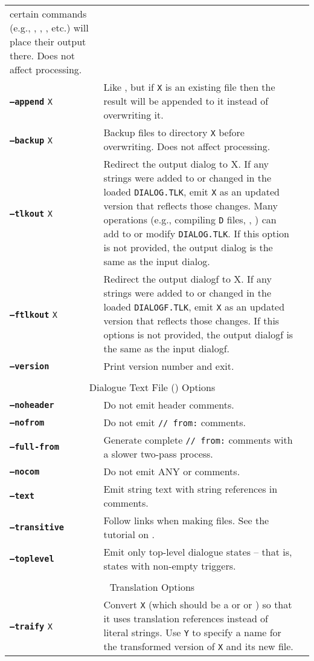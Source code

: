 \documentclass{article}
\def\ttref#1{\ahrefloc{#1}{\tt #1}}
\def\DEFINE#1{{\tt \bf #1}\label{#1}\index{#1}}
\def\t#1{{\tt #1}}
\begin{document}
\begin{tabular}{lp{10in}|p{10in}}
certain commands (e.g., \ttref{D}, \ttref{DLG}, \ttref{--biff-get}, etc.)
will place their output there.  Does not affect \ttref{TP2} processing. \\
\DEFINE{--append} \t{X} & Like \ttref{--out}, but if \t{X} is an existing
file then the result will be appended to it instead of overwriting it. \\
\DEFINE{--backup} \t{X} &	Backup files to directory {\tt X} before overwriting. Does not affect \ttref{TP2} processing. \\
\DEFINE{--tlkout} \t{X} & Redirect the output dialog to X. If any strings were added to or changed in the loaded \t{DIALOG.TLK}, emit \t{X} as an updated version that reflects those changes. Many operations (e.g., compiling \t{D} files, \ttref{--tlkmerge}, \ttref{STRING!SET}) can add to or modify \t{DIALOG.TLK}. If this option is not provided, the output dialog is the same as the input dialog. \\
\DEFINE{--ftlkout} \t{X} & Redirect the output dialogf to X. If any strings were added to or changed in the
loaded \t{DIALOGF.TLK}, emit \t{X} as an updated version that reflects
those changes. If this options is not provided, the output dialogf is the same as the input dialogf. \\
\DEFINE{--version} & Print version number and exit. \\
\\
\multicolumn{2}{c}{ \color{red} Dialogue Text File (\ttref{D}) Options} \\
\DEFINE{--noheader} &	Do not emit \ttref{D} header comments. \\
\DEFINE{--nofrom} &	Do not emit \ttref{D} {\tt // from:} comments. \\
\DEFINE{--full-from} &  Generate complete {\tt // from:} comments with a
slower two-pass process. \\
\DEFINE{--nocom} & Do not emit ANY \ttref{D} or \ttref{BAF} comments. \\
\DEFINE{--text} & Emit string text with string references in comments. \\
\DEFINE{--transitive} & Follow \ttref{EXTERN} links when making \ttref{D}
files. See the tutorial on \ttref{--transitive}. \\
\DEFINE{--toplevel} & Emit only top-level dialogue states -- that is,
states with non-empty triggers. \\
\\
\multicolumn{2}{c}{ \color{red} Translation Options} \\
\DEFINE{--traify} \t{X} & Convert \t{X} (which should be a \ttref{D} or \ttref{TP2} or \ttref{BAF}) so that it uses translation references instead of literal strings. Use \ttref{--out} \t{Y} to specify a name for the transformed version of \t{X} and its new \ttref{TRA} file. \\

\end{tabular}
\end{document}
